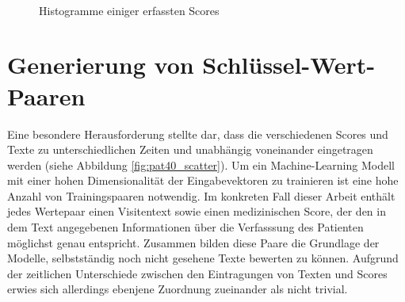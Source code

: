 \begin{figure}[htb]
    \captionsetup[subfigure]{labelformat=empty, justification=centering}

    \centering
     \qquad
     \\ %
     \qquad
    \caption{Histogramme einiger erfassten Scores}
    \label{fig:score_histograms}
\end{figure}


\section{Generierung von Schlüssel-Wert-Paaren}
Eine besondere Herausforderung stellte dar, dass die verschiedenen Scores und Texte zu unterschiedlichen Zeiten und unabhängig voneinander eingetragen werden (siehe Abbildung \ref{fig:pat40_scatter}).
Um ein Machine-Learning Modell mit einer hohen Dimensionalität der Eingabevektoren zu trainieren ist eine hohe Anzahl von Trainingspaaren notwendig. Im konkreten Fall dieser Arbeit enthält jedes Wertepaar einen Visitentext sowie einen medizinischen Score, der den in dem Text angegebenen Informationen über die Verfasssung des Patienten möglichst genau entspricht. Zusammen bilden diese Paare die Grundlage der Modelle, selbstständig noch nicht gesehene Texte bewerten zu können. Aufgrund der zeitlichen Unterschiede zwischen den Eintragungen von Texten und Scores erwies sich allerdings ebenjene Zuordnung zueinander als nicht trivial. 


